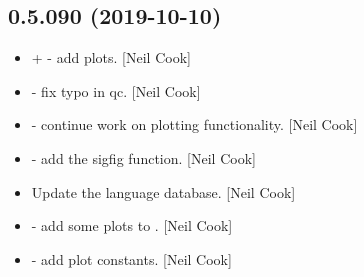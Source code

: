 \documentclass[a4paper,10pt,english]{report}
\begin{document}
\subsection{0.5.090 (2019-10-10)}
\label{\detokenize{misc/changelog:id52}}\begin{itemize}
\item {} 
 +  -
add plots. {[}Neil Cook{]}

\item {} 
 - fix typo in qc. {[}Neil Cook{]}

\item {} 
 - continue work on plotting functionality. {[}Neil Cook{]}

\item {} 
 - add the sigfig function. {[}Neil Cook{]}

\item {} 
Update the language database. {[}Neil Cook{]}

\item {} 
 - add some plots to
. {[}Neil Cook{]}

\item {} 
 - add plot constants. {[}Neil
Cook{]}

\end{itemize}
\end{document}
